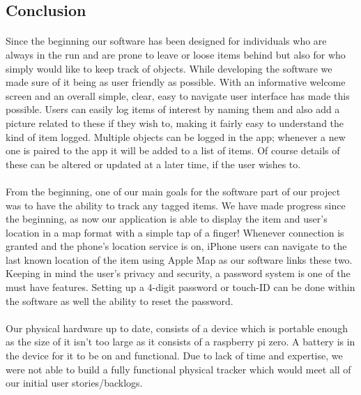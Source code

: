 \documentclass[12pt,a4paper]{article}
\begin{document}
      \subsection{Conclusion}      
        \paragraph{} Since the beginning our software has been designed for individuals who are always in the run and are prone to leave or loose items behind but also for who simply would like to keep track of objects. While developing the software we made sure of it being as user friendly as possible. With an informative welcome screen and an overall simple, clear, easy to navigate user interface has made this possible. Users can easily log items of interest by naming them and also add a picture related to these if they wish to, making it fairly easy to understand the kind of item logged. Multiple objects can be logged in the app; whenever a new one is paired to the app it will be added to a list of items. Of course details of these can be altered or updated at a later time, if the user wishes to.
        
        \paragraph{} From the beginning, one of our main goals for the software part of our project was to have the ability to track any tagged items. We have made progress since the beginning, as now our application is able to display the item and user’s location in a map format with a simple tap of a finger! Whenever connection is granted and the phone’s location service is on, iPhone users can navigate to the last known location of the item using Apple Map as our software links these two. Keeping in mind the user’s privacy and security, a password system is one of the must have features. Setting up a 4-digit password or touch-ID can be done within the software as well the ability to reset the password.
        
        \paragraph{} Our physical hardware up to date, consists of a device which is portable enough as the size of it isn’t too large as it consists of a raspberry pi zero. A battery is in the device for it to be on and functional. Due to lack of time and expertise, we were not able to build a fully functional physical tracker which would meet all of our initial user stories/backlogs.
\end{document}

